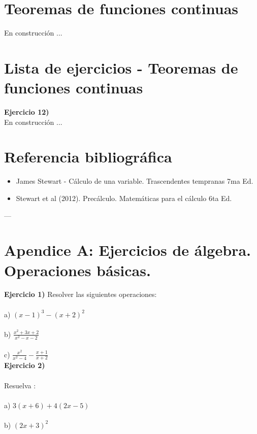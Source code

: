 \documentclass[11pt, a4paper]{article}
\begin{document}
{\newpage

\section{Teoremas de funciones continuas} 
{ \color{red} En construcci\'on ... } 

\newpage 

\section{Lista de ejercicios - Teoremas de funciones continuas }
\textbf{Ejercicio 12)} \\
{ \color{red} En construcci\'on ... }
\newpage

\section{ Referencia bibliogr\'afica }

\begin{itemize}
    \item James Stewart - C\'alculo de una variable. Trascendentes tempranas 7ma Ed. 
    \item  Stewart et al (2012). Prec\'alculo. Matem\'aticas para el c\'alculo 6ta Ed.
    
\end{itemize}

---

\section{ Apendice A: Ejercicios de \'algebra. Operaciones b\'asicas.   }
    
\textbf{ Ejercicio 1) } 
Resolver las siguientes operaciones: \\ \\
a) $ (x-1)^3 - (x+2)^2 $ \\ \\
b) $  \displaystyle  \frac{x^2 + 3x + 2}{ x^2 - x - 2 } $ \\ \\
c) $  \displaystyle  \frac{x^2}{ x^2 - 4 } - \frac{x+1}{x+2} $ \\ 

\textbf{ Ejercicio 2) } \\ \\
Resuelva : \\ \\
a) $ 3(x+6) + 4(2x-5) $ \\ \\
b) $ (2x + 3)^2 $ \\

}
\end{document}
